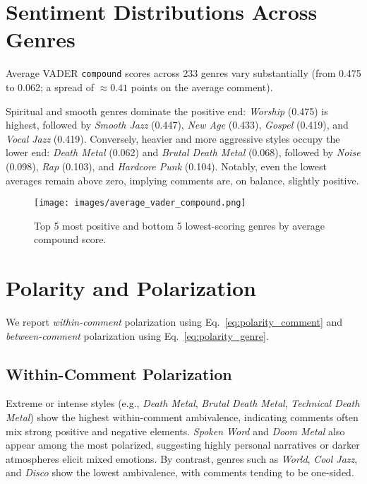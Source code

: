 \section{Sentiment Distributions Across Genres}
\label{subsec:results_distributions}

Average VADER \texttt{compound} scores across 233 genres vary substantially
(from 0.475 to 0.062; a spread of $\approx 0.41$ points on the average comment).

Spiritual and smooth genres dominate the positive end: \textit{Worship} (0.475)
is highest, followed by \textit{Smooth Jazz} (0.447), \textit{New Age} (0.433),
\textit{Gospel} (0.419), and \textit{Vocal Jazz} (0.419). Conversely, heavier and more
aggressive styles occupy the lower end: \textit{Death Metal} (0.062) and
\textit{Brutal Death Metal} (0.068), followed by \textit{Noise} (0.098),
\textit{Rap} (0.103), and \textit{Hardcore Punk} (0.104). Notably, even the lowest
averages remain above zero, implying comments are, on balance, slightly positive.
\begin{figure}[htbp]
    \centering
    \texttt{[image: images/average\_vader\_compound.png]}
    \caption{Top 5 most positive and bottom 5 lowest-scoring genres by average compound score.}
    \label{fig:average_vader_compound}
\end{figure}
\FloatBarrier


\section{Polarity and Polarization}
\label{subsec:results_polarization}

We report \emph{within-comment} polarization using Eq.~\eqref{eq:polarity_comment}
and \emph{between-comment} polarization using Eq.~\eqref{eq:polarity_genre}.

\subsection*{Within-Comment Polarization}
\label{subsubsec:results_within}

 Extreme or intense styles (e.g., \textit{Death Metal},
\textit{Brutal Death Metal}, \textit{Technical Death Metal}) show the highest within-comment
ambivalence, indicating comments often mix strong positive and negative elements.
\textit{Spoken Word} and \textit{Doom Metal} also appear among the most polarized,
suggesting highly personal narratives or darker atmospheres elicit mixed emotions.
By contrast, genres such as \textit{World}, \textit{Cool Jazz}, and \textit{Disco}
show the lowest ambivalence, with comments tending to be one-sided.

